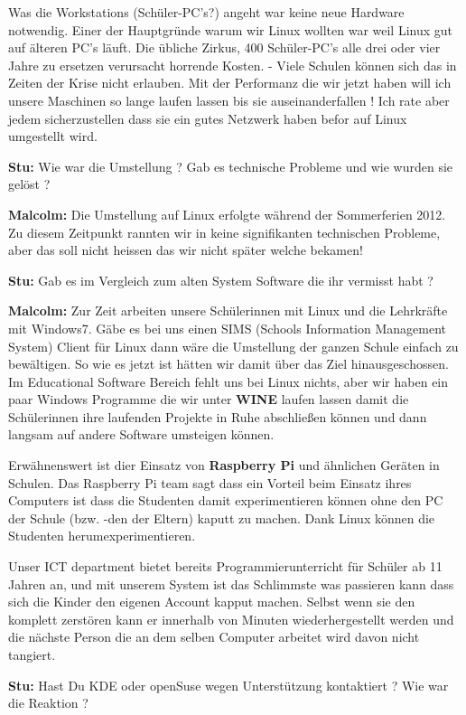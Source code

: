 Was die Workstations (Schüler-PC's?) angeht war keine neue Hardware notwendig. Einer der Hauptgründe warum wir Linux wollten war weil Linux gut auf älteren PC's läuft. Die übliche Zirkus, 400 Schüler-PC's alle drei oder vier Jahre zu ersetzen verursacht horrende Kosten.
-
Viele Schulen können sich das in Zeiten der Krise nicht erlauben. Mit der Performanz die wir jetzt haben will ich unsere Maschinen so lange laufen lassen bis sie auseinanderfallen ! Ich rate aber jedem sicherzustellen dass sie ein gutes Netzwerk haben befor auf Linux umgestellt wird.

\textbf{Stu:} Wie war die Umstellung ? Gab es technische Probleme und wie wurden sie gelöst ?

\textbf{Malcolm:} Die Umstellung auf Linux erfolgte während der Sommerferien 2012. Zu diesem Zeitpunkt rannten wir in keine signifikanten technischen Probleme, aber das soll nicht heissen das wir nicht später welche bekamen!

\textbf{Stu:} Gab es im Vergleich zum alten System Software die ihr vermisst habt ?

\textbf{Malcolm:} Zur Zeit arbeiten unsere Schülerinnen mit Linux und die Lehrkräfte mit Windows7. Gäbe es bei uns einen SIMS (Schools Information Management System) Client für Linux dann wäre die Umstellung der ganzen Schule einfach zu bewältigen. So wie es jetzt ist hätten wir damit über das Ziel hinausgeschossen. Im Educational Software Bereich fehlt uns bei Linux nichts, aber wir haben ein paar Windows Programme die wir unter \textbf{WINE} laufen lassen damit die Schülerinnen ihre laufenden Projekte in Ruhe abschließen können und dann langsam auf andere Software umsteigen können.

Erwähnenswert ist dier Einsatz von \textbf{Raspberry Pi} und ähnlichen Geräten in Schulen. Das Raspberry Pi team sagt dass ein Vorteil beim Einsatz ihres Computers ist dass die Studenten damit experimentieren können ohne den PC der Schule (bzw. -den der Eltern) kaputt zu machen. Dank Linux können die Studenten herumexperimentieren. 

Unser ICT department bietet bereits Programmierunterricht für Schüler ab 11 Jahren an, und mit unserem System ist das Schlimmste was passieren kann dass sich die Kinder den eigenen Account kapput machen. Selbst wenn sie den komplett zerstören kann er innerhalb von Minuten wiederhergestellt werden und die nächste Person die an dem selben Computer arbeitet wird davon nicht tangiert. 

\textbf{Stu:} Hast Du KDE oder openSuse wegen Unterstützung kontaktiert ? Wie war die Reaktion ? 


